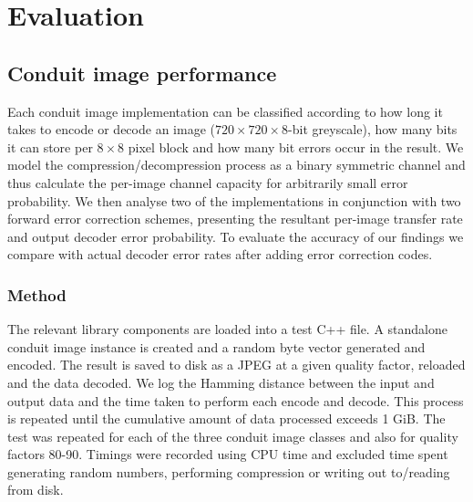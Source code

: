 \chapter{Evaluation}\label{ch:evaluation}

\section{Conduit image performance}

Each conduit image implementation can be classified according to how long it takes to encode or decode an image ($720 \times 720 \times 8$-bit greyscale), how many bits it can store per $8 \times 8$ pixel block and how many bit errors occur in the result. We model the compression/decompression process as a binary symmetric channel and thus calculate the per-image channel capacity for arbitrarily small error probability. We then analyse two of the implementations in conjunction with two forward error correction schemes, presenting the resultant per-image transfer rate and output decoder error probability. To evaluate the accuracy of our findings we compare with actual decoder error rates after adding error correction codes.

\subsection{Method}

The relevant library components are loaded into a test C++ file. A standalone conduit image instance is created and a random byte vector generated and encoded. The result is saved to disk as a JPEG at a given quality factor, reloaded and the data decoded. We log the Hamming distance between the input and output data and the time taken to perform each encode and decode. This process is repeated until the cumulative amount of data processed exceeds 1 GiB. The test was repeated for each of the three conduit image classes and also for quality factors 80-90. Timings were recorded using CPU time and excluded time spent generating random numbers, performing compression or writing out to/reading from disk.


